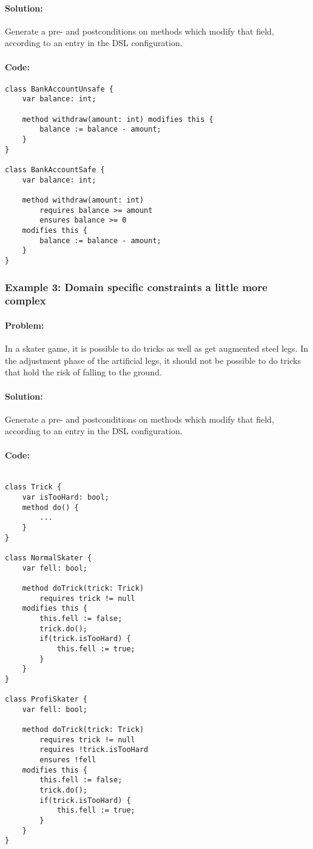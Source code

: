 \paragraph{Solution:}
Generate a pre- and postconditions on methods which modify that field, according to an entry in the DSL configuration.

\paragraph{Code:}
\lstset{style=dafny}
\begin{lstlisting}
class BankAccountUnsafe {
	var balance: int;
	
	method withdraw(amount: int) modifies this {
		balance := balance - amount;
	}
}

class BankAccountSafe {
	var balance: int;
	
	method withdraw(amount: int) 
		requires balance >= amount  
		ensures balance >= 0  
	modifies this {
		balance := balance - amount;
	}
}
\end{lstlisting}


\subsubsection{Example 3: Domain specific constraints a little more complex} \label{Example 3}
\paragraph{Problem:}
In a skater game, it is possible to do tricks as well as get augmented steel legs. In the adjustment phase of the artificial legs, it should not be possible to do tricks that hold the risk of falling to the ground.
\paragraph{Solution:}
Generate a pre- and postconditions on methods which modify that field, according to an entry in the DSL configuration.

\paragraph{Code:}
\lstset{style=dafny}
\begin{lstlisting}

class Trick {
	var isTooHard: bool;
	method do() {
		...
	}
}

class NormalSkater {
	var fell: bool;
	
	method doTrick(trick: Trick) 
		requires trick != null
	modifies this {
		this.fell := false;
		trick.do();
		if(trick.isTooHard) {
			this.fell := true;
		}
	}
}

class ProfiSkater {
	var fell: bool;
	
	method doTrick(trick: Trick) 
		requires trick != null
		requires !trick.isTooHard
		ensures !fell
	modifies this {
		this.fell := false;
		trick.do();
		if(trick.isTooHard) {
			this.fell := true;
		}
	}
}

\end{lstlisting}

